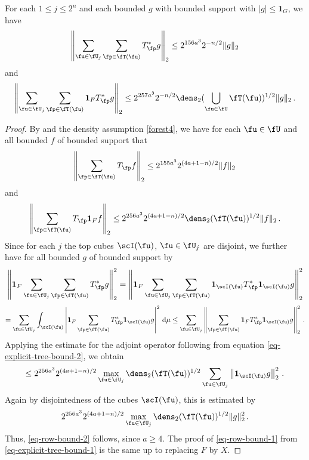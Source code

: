 \begin{lemma}
    \label{row-bound}
    \leanok
    For each $1 \le j \le 2^n$ and each bounded $g$ with bounded support with $|g| \le \mathbf{1}_G$,
    we have
    \begin{equation}
        \label{eq-row-bound-1}
        \left\| \sum_{\fu \in \fU_j} \sum_{\fp \in \fT(\fu)} T_{\fp}^* g\right\|_2 \le 2^{156a^3} 2^{-n/2} \|g\|_2
    \end{equation}
    and
    \begin{equation}
        \label{eq-row-bound-2}
        \left\| \sum_{\fu \in \fU_j} \sum_{\fp \in \fT(\fu)} \mathbf{1}_F T_{\fp}^* g\right\|_2 \le 2^{257a^3} 2^{-n/2} \dens_2(\bigcup_{\fu\in \fU}\fT(\fu))^{1/2} \|g\|_2\,.
    \end{equation}
\end{lemma}

\begin{proof}
    By  and the density assumption \eqref{forest4}, we have for each $\fu \in \fU$ and all bounded $f$ of bounded support that
    \begin{equation}
        \label{eq-explicit-tree-bound-1}
        \left\|\sum_{\fp \in \fT(\fu)} T_{\fp} f \right\|_{2} \le 2^{155a^3} 2^{(4a+1-n)/2} \|f\|_2\,
    \end{equation}
    and
    \begin{equation}
        \label{eq-explicit-tree-bound-2}
        \left\|\sum_{\fp \in \fT(\fu)} T_{\fp} \mathbf{1}_F f \right\|_{2} \le 2^{256a^3} 2^{(4a + 1-n)/2} \dens_2(\fT(\fu))^{1/2} \|f\|_2\,.
    \end{equation}
    Since for each $j$ the top cubes $\scI(\fu)$, $\fu \in \fU_j$ are disjoint, we further have for all bounded $g$ of bounded support by 
    $$
        \left\|\mathbf{1}_F \sum_{\fu \in \fU_j} \sum_{\fp \in \fT(\fu)} T_{\fp}^* g\right\|_2^2 = \left\|\mathbf{1}_F \sum_{\fu \in \fU_j} \sum_{\fp \in \fT(\fu)} \mathbf{1}_{\scI(\fu)} T_{\fp}^* \mathbf{1}_{\scI(\fu)} g\right\|_2^2
    $$
    $$
        = \sum_{\fu \in \fU_j} \int_{\scI(\fu)} \left| \mathbf{1}_F \sum_{\fp \in \fT(\fu)} T_{\fp}^* \mathbf{1}_{\scI(\fu)} g\right|^2 \, \mathrm{d}\mu
        \le \sum_{\fu \in \fU_j} \left\|\sum_{\fp \in \fT(\fu)} \mathbf{1}_F T_{\fp}^* \mathbf{1}_{\scI(\fu)} g\right\|_2^2\,.
    $$
    Applying the estimate for the adjoint operator following from equation \eqref{eq-explicit-tree-bound-2}, we obtain
    $$
        \le 2^{256a^3} 2^{(4a+1-n)/2} \max_{\fu \in \fU_j}\dens_2(\fT(\fu))^{1/2} \sum_{\fu \in \fU_j} \left\| \mathbf{1}_{\scI(\fu)} g\right\|_2^2\,.
    $$
    Again by disjointedness of the cubes $\scI(\fu)$, this is estimated by
    $$
        2^{256a^3} 2^{(4a+1-n)/2} \max_{\fu \in \fU_j}\dens_2(\fT(\fu))^{1/2} \|g\|_2^2\,.
    $$
    Thus, \eqref{eq-row-bound-2} follows, since $a \ge 4$.
    The proof of \eqref{eq-row-bound-1} from \eqref{eq-explicit-tree-bound-1} is the same up to replacing $F$ by $X$.
\end{proof}

